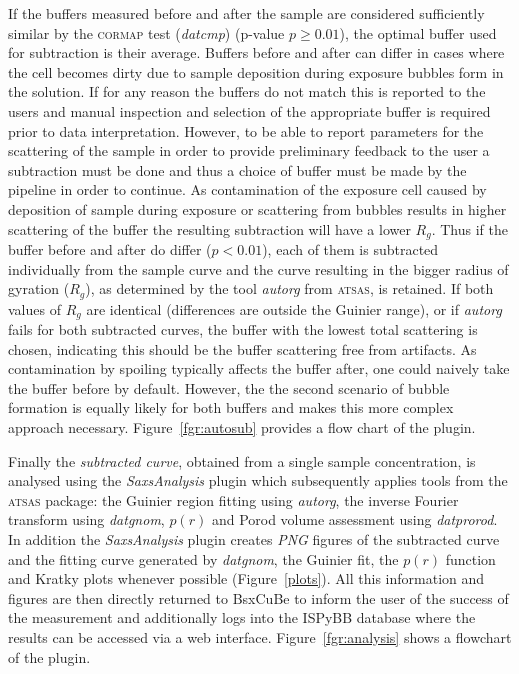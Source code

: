 \documentclass[preprint,pdf]{iucr}              %
\begin{document}
If the buffers measured before and after the sample are considered sufficiently similar by the \textsc{cormap} test (\textit{datcmp}) (p-value $p \geq 0.01$), the optimal buffer used for subtraction is their average. 
Buffers before and after can differ in cases where the cell becomes dirty due to sample deposition during exposure bubbles form in the solution. 
If for any reason the buffers do not match this is reported to the users and manual inspection and selection of the appropriate buffer is required prior to data interpretation. 
However, to be able to report parameters for the scattering of the sample in order to provide preliminary feedback to the user a subtraction must be done and thus a choice of buffer must be made by the pipeline in order to continue. 
As contamination of the exposure cell caused by deposition of sample during exposure or scattering from bubbles results in higher scattering of the buffer the resulting subtraction will have a lower $R_{g}$. 
Thus if the buffer before and after do differ ($p < 0.01$), each of them is subtracted individually from the sample curve and the curve resulting in the bigger radius of gyration ($R_g$), as determined by the tool \textit{autorg} from \textsc{atsas}, is retained.
If both values of $R_g$ are identical (differences are outside the Guinier range), or if \textit{autorg} fails for both subtracted curves, the buffer with the lowest total scattering is chosen, indicating this should be the buffer scattering free from artifacts. 
As contamination by spoiling typically affects the buffer after, one could naively take the buffer before by default. However, the the second scenario of bubble formation is equally likely for both buffers and makes this more complex approach necessary.
Figure~\ref{fgr:autosub} provides a flow chart of the plugin.



Finally the \textit{subtracted curve}, obtained from a single sample
concentration, is analysed using the \textit{SaxsAnalysis} plugin which
subsequently applies tools from the \textsc{atsas} package: the Guinier region fitting using \textit{autorg}, 
the inverse Fourier transform using \textit{datgnom}, 
$p(r)$ and Porod volume assessment using \textit{datprorod}.
In addition the \textit{SaxsAnalysis} plugin creates \textit{PNG} figures of
the subtracted curve and the fitting curve generated by \textit{datgnom}, the
Guinier fit, the $p(r)$ function and Kratky plots whenever possible (Figure~\ref{plots}).
All this information and figures are then directly returned to BsxCuBe to inform
the user of the success of the measurement and additionally logs into the
ISPyBB database \cite{ISPYBB} where the results can be accessed via a web
interface.
Figure~\ref{fgr:analysis} shows a flowchart of the plugin.
\end{document}
